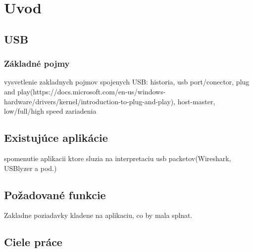 \chapter{Uvod}

\section{USB}
\subsection{Základné pojmy}
vysvetlenie zakladnych pojmov spojenych USB: historia, usb port/conector, plug and play(https://docs.microsoft.com/en-us/windows-hardware/drivers/kernel/introduction-to-plug-and-play), host-master, low/full/high speed zariadenia
\section{Existujúce aplikácie}
spomenutie aplikacii ktore sluzia na interpretaciu usb packetov(Wireshark, USBlyzer a pod.)
\section{Požadované funkcie}
Zakladne poziadavky kladene na aplikaciu, co by mala splnat.
\section{Ciele práce}







